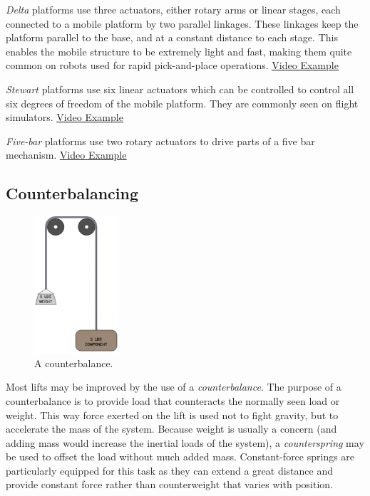 \begin{asparaenum}[a)]
	\item \textit{Delta} platforms use three actuators, either rotary arms or linear stages, each connected to a mobile platform by two parallel linkages. These linkages keep the platform parallel to the base, and at a constant distance to each stage. This enables the mobile structure to be extremely light and fast, making them quite common on robots used for rapid pick-and-place operations. \href{https://www.youtube.com/watch?v=Gv5B63HeF1E}{\color{red}\underline{Video Example}}
	\item \textit{Stewart} platforms use six linear actuators which can be controlled to control all six degrees of freedom of the mobile platform. They are commonly seen on flight simulators. \href{https://www.youtube.com/watch?v=zNUBZfrOXUc}{\color{red}\underline{Video Example}}
	\item \textit{Five-bar} platforms use two rotary actuators to drive parts of a five bar mechanism. \href{https://www.youtube.com/watch?v=dnixuCu49o4}{\color{red}\underline{Video Example}}
\end{asparaenum}

\subsection{Counterbalancing}
\begin{figure}[H]
	\includegraphics[height=2in]{imgs/counterbalance.png}
	\caption{A counterbalance.}
\end{figure}

Most lifts may be improved by the use of a \textit{counterbalance}. The purpose of a counterbalance is to provide load that counteracts the normally seen load or weight. This way force exerted on the lift is used not to fight gravity, but to accelerate the mass of the system. Because weight is usually a concern (and adding mass would increase the inertial loads of the system), a \textit{counterspring} may be used to offset the load without much added mass. Constant-force springs are particularly equipped for this task as they can extend a great distance and provide constant force rather than counterweight that varies with position.


